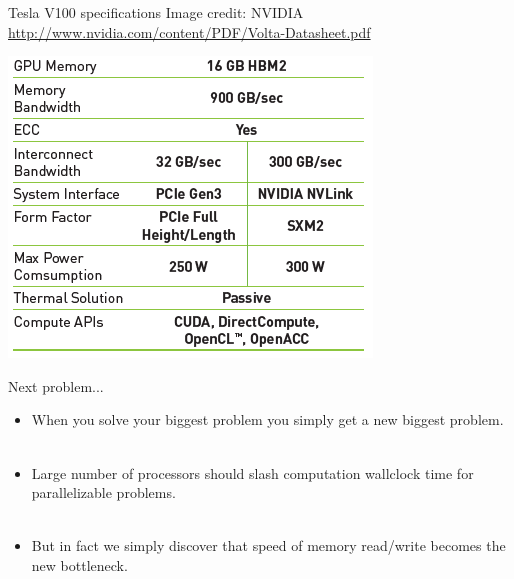 \documentclass[usenames,dvipsnames]{beamer}
\begin{document}
\begin{frame}{Tesla V100 specifications} {\tiny Image credit: NVIDIA \url{http://www.nvidia.com/content/PDF/Volta-Datasheet.pdf}}
  \begin{block}{}
    \begin{center}
      \includegraphics[scale=0.83]{V100_specsheet_B.png}
    \end{center}
  \end{block}
\end{frame}

\begin{frame}{Next problem...}
  \begin{block}{}
    \begin{itemize}
      \item{When you solve your biggest problem you simply get a new biggest problem.}\\~\
      \item{Large number of processors should slash computation wallclock time for parallelizable problems.}\\~\
      \item{But in fact we simply discover that speed of memory read/write becomes the new bottleneck.}\\~\
    \end{itemize}
  \end{block}
\end{frame}
\end{document}
